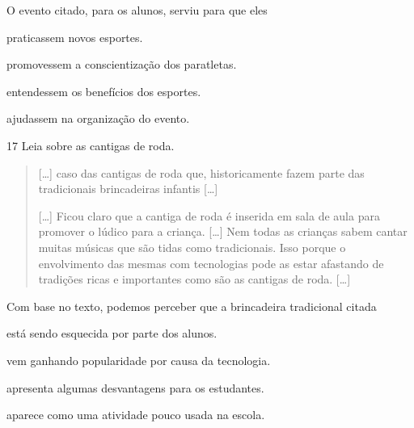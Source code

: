 
\noindent{}O evento citado, para os alunos, serviu para que eles

\begin{escolha}
\item praticassem novos esportes.

\item promovessem a conscientização dos paratletas.

\item entendessem os benefícios dos esportes.

\item ajudassem na organização do evento.
\end{escolha}


\num{17} Leia sobre as cantigas de roda.
\begin{quote}
  {[}\ldots{}{]} caso das cantigas de roda que, historicamente fazem parte
  das tradicionais brincadeiras infantis {[}\ldots{}{]}

{[}\ldots{}{]} Ficou claro que a cantiga de roda é inserida em sala de aula
para promover o lúdico para a criança. {[}\ldots{}{]} Nem todas as crianças
sabem cantar muitas músicas que são tidas como tradicionais. Isso porque
o envolvimento das mesmas com tecnologias pode as estar afastando de
tradições ricas e importantes como são as cantigas de roda. {[}\ldots{}{]}

\end{quote}

\noindent{}Com base no texto, podemos perceber que a brincadeira tradicional citada

\begin{escolha}
\item está sendo esquecida por parte dos alunos.

\item vem ganhando popularidade por causa da tecnologia.

\item apresenta algumas desvantagens para os estudantes.

\item aparece como uma atividade pouco usada na escola.
\end{escolha}

